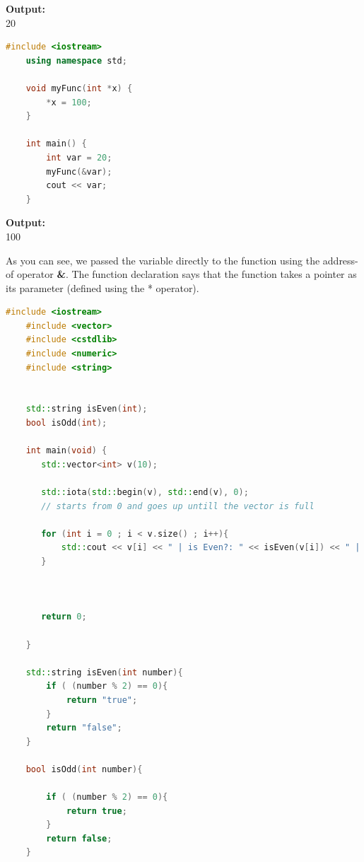 \documentclass[12pt , a4paper]{article}
\begin{document}
	\begin{tcolorbox}
	\textbf{Output:}\\
	20
	\end{tcolorbox}

	\begin{lstlisting}[language=C++]
	#include <iostream>
	using namespace std;
	
	void myFunc(int *x) {
	    *x = 100;
	}
	
	int main() {
	    int var = 20;
	    myFunc(&var);
	    cout << var;
	}

	\end{lstlisting}

	\begin{tcolorbox}
	\textbf{Output:}\\
	100
	\end{tcolorbox}
As you can see, we passed the variable directly to the function using the address-of operator \textbf{\&}. The function declaration says that the function takes a pointer as its parameter (defined using the * operator).
	\begin{lstlisting}[language=C++]
	#include <iostream>
	#include <vector>
	#include <cstdlib>
	#include <numeric>
	#include <string>
	
	
	std::string isEven(int);
	bool isOdd(int);
	
	int main(void) {
	   std::vector<int> v(10);
	
	   std::iota(std::begin(v), std::end(v), 0);
	   // starts from 0 and goes up untill the vector is full
	
	   for (int i = 0 ; i < v.size() ; i++){
	       std::cout << v[i] << " | is Even?: " << isEven(v[i]) << " | Is Odd?:" << isOdd(v[i]) << std::endl;
	   }
	
	
	
	   return 0;
	
	}
	
	std::string isEven(int number){
	    if ( (number % 2) == 0){
	        return "true";
	    }
	    return "false";
	}
	
	bool isOdd(int number){
	
	    if ( (number % 2) == 0){
	        return true;
	    }
	    return false;
	}
	\end{lstlisting}
\end{document}
